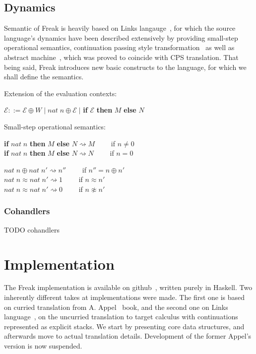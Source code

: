 \documentclass[declaration,shortabstract]{iithesis}
\theoremstyle{definition} \newtheorem{definition}{Definition}[chapter]
\theoremstyle{remark} \newtheorem{remark}[definition]{Observation}
\theoremstyle{plain} \newtheorem{theorem}[definition]{Theorem}
\theoremstyle{plain} \newtheorem{lemma}[definition]{Lemma}
\begin{document}
\section{Dynamics}

    Semantic of Freak is heavily based on Links langauge~\cite{handlers-cps-journal},
    for which the source language's dynamics have been described extensively by
    providing small-step operational semantics, continuation passing style
    transformation~\cite{handlers-cps} as well as abstract
    machine~\cite{liberating-effects}, which was proved to coincide with CPS
    translation. That being said, Freak introduces new basic constructs to the
    language, for which we shall define the semantics.

    \noindent
    Extension of the evaluation contexts:

    \noindent
    $\mathcal{E} ::= \mathcal{E} \oplus W \; | \; nat \; n \oplus \mathcal{E} \; |$ \textbf{if} $\mathcal{E}$ \textbf{then} $M$ \textbf{else} $N$

    \noindent
    Small-step operational semantics:

    \noindent
    \textbf{if} $nat \; n$ \textbf{then} $M$ \textbf{else} $N \rightsquigarrow M \quad \quad $ if $n \neq 0$ \\
    \textbf{if} $nat \; n$ \textbf{then} $M$ \textbf{else} $N \rightsquigarrow N \quad \quad $ if $n = 0$

    \noindent
    $nat \; n \oplus nat \; n' \rightsquigarrow n'' \quad \quad $    if $ n'' = n \oplus n' $ \\
    $nat \; n \approx nat \; n' \rightsquigarrow 1  \quad \quad $    \; if $ n \approx n' $ \\
    $nat \; n \approx nat \; n' \rightsquigarrow 0  \quad \quad $    \; if $ n \not\approx n' $

    \subsection{Cohandlers}

    TODO cohandlers

\chapter{Implementation}\label{chapter:implementation}

    The Freak implementation is available on github~\cite{freak}, written purely
    in Haskell. Two inherently different takes at implementations were made. The
    first one is based on curried translation from A. Appel~\cite{appel-continuations}
    book, and the second one on Links language~\cite{handlers-cps, handlers-cps-journal},
    on the uncurried translation to target calculus with continuations represented
    as explicit stacks. We start by presenting core data structures, and
    afterwards move to actual translation details. Development of the former
    Appel's version is now suspended.
\end{document}
